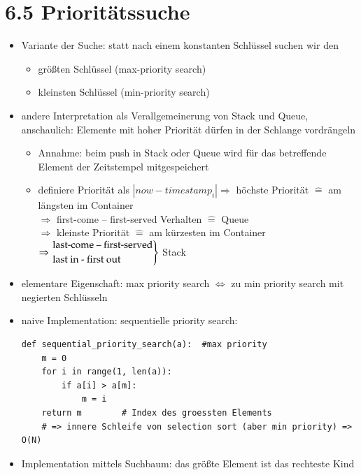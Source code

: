 \documentclass[11pt, fleqn]{scrreprt}
\begin{document}
\section*{6.5 Prioritätssuche}
\begin{itemize}
    \item Variante der Suche: statt nach einem konstanten Schlüssel suchen wir den
    \begin{itemize}
        \item größten Schlüssel (max-priority search)
        \item kleinsten Schlüssel (min-priority search)
    \end{itemize}
    \item andere Interpretation als Verallgemeinerung von Stack und Queue, anschaulich: Elemente mit hoher Priorität dürfen in der Schlange vordrängeln
    \begin{itemize}
        \item Annahme: beim push in Stack oder Queue wird für das betreffende Element der Zeitstempel mitgespeichert
        \item definiere Priorität als $| now - timestamp_i| \Rightarrow$ höchste Priorität $\widehat{=}$ am längsten im Container \\
        \hspace*{1cm} $\Rightarrow$ first-come – first-served Verhalten $\widehat{=}$ Queue \\
        $\Rightarrow$ kleinste Priorität $\widehat{=}$ am kürzesten im Container $\Rightarrow \begin{rcases} \text{last-come – first-served} \\
            \text{last in - first out}\end{rcases}$ Stack
    \end{itemize}
        \item elementare Eigenschaft: max priority search $\Leftrightarrow$ zu min priority search mit negierten Schlüsseln
        \item naive Implementation: sequentielle priority search:
        \begin{verbatim}
def sequential_priority_search(a):  #max priority
    m = 0
    for i in range(1, len(a)):
        if a[i] > a[m]:
            m = i
    return m        # Index des groessten Elements
    # => innere Schleife von selection sort (aber min priority) => O(N)
        \end{verbatim}
        \item Implementation mittels Suchbaum: das größte Element ist das \glqq rechteste Kind\grqq

\end{itemize}
\end{document}
